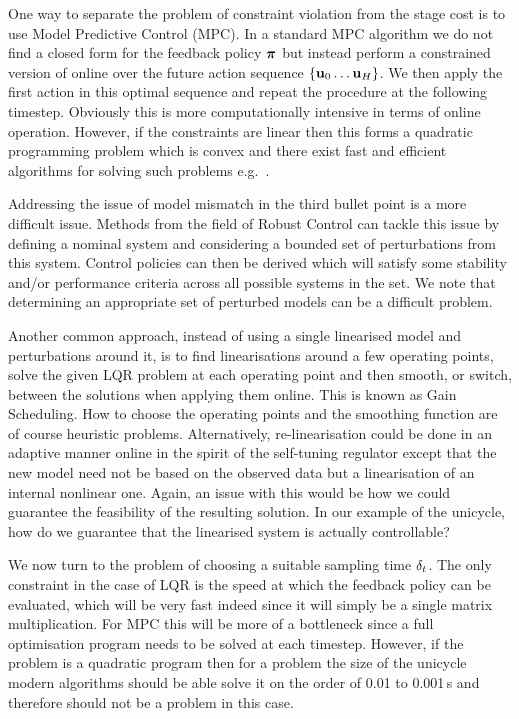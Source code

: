 One way to separate the problem of constraint violation from the stage cost is to use Model Predictive Control (MPC). In a standard MPC algorithm we do not find a closed form for the feedback policy $\boldsymbol{\pi}$ but instead perform a constrained version of  online over the future action sequence $\{\mathbf{u}_0\dots\mathbf{u}_H\}$. We then apply the first action in this optimal sequence and repeat the procedure at the following timestep. Obviously this is more computationally intensive in terms of online operation. However, if the constraints are linear then this forms a quadratic programming problem which is convex and there exist fast and efficient algorithms for solving such problems e.g.\ \cite{BoVa04}.




Addressing the issue of model mismatch in the third bullet point is a more difficult issue. Methods from the field of Robust Control can tackle this issue by defining a nominal system and considering a bounded set of perturbations from this system. Control policies can then be derived which will satisfy some stability and/or performance criteria across all possible systems in the set. We note that determining an appropriate set of perturbed models can be a difficult problem.

Another common approach, instead of using a single linearised model and perturbations around it, is to find linearisations around a few operating points, solve the given LQR problem at each operating point and then smooth, or switch, between the solutions when applying them online. This is known as Gain Scheduling. How to choose the operating points and the smoothing function are of course heuristic problems. 
%
Alternatively, re-linearisation could be done in an adaptive manner online in the spirit of the self-tuning regulator except that the new model need not be based on the observed data but a linearisation of an internal nonlinear one. Again, an issue with this would be how we could guarantee the feasibility of the resulting solution. In our example of the unicycle, how do we guarantee that the linearised system is actually controllable?

We now turn to the problem of choosing a suitable sampling time $\delta_t$. The only constraint in the case of LQR is the speed at which the feedback policy can be evaluated, which will be very fast indeed since it will simply be a single matrix multiplication. For MPC this will be more of a bottleneck since a full optimisation program needs to be solved at each timestep. However, if the problem is a quadratic program then for a problem the size of the unicycle modern algorithms should be able solve it on the order of 0.01 to 0.001$\,$s and therefore should not be a problem in this case.


